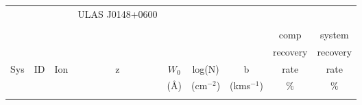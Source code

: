 \documentclass[12pt]{article}
\begin{document}
\begin{footnotesize}
\begin{longtable}{ c c c c c c c c c}  
			&	   &                           &            \Large{ULAS J0148+0600}    & 	& 					&							  	\\     
	     &        	&                           &				&				   &	                    &         	     		 	&  \\              
\hline                                                                                                                                                   
\hline                                                                                                                                                   
     	        &     	&                           &				&				   &	                    &         	     		 	& 		comp		& 		system	  	 \\    
                                                                                                                                                         
        &     	&                           &				&				   &	                    &         	     		 	& 		recovery			& 		recovery  	 \\    
   Sys  & ID  &   Ion     				   &  z 			&      $W_0$       &     log(N)				&    b						&   	rate	&   	rate   \\                      
          &         &                           &			&     	(\AA)		 &    (cm$^{-2}$)     &    (kms$^{ -1}$)	&        	$\%$	       & $\%$	\\         
		&	   &                           &            & 	& 					&							  	& \\                                                                 
                                                                                                                                                         

\end{longtable}
\end{footnotesize}
\end{document}
